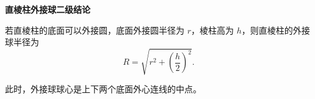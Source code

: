 \textbf{直棱柱外接球二级结论}

若直棱柱的底面可以外接圆，底面外接圆半径为 $r$，棱柱高为 $h$，则直棱柱的外接球半径为
\[
	R=\sqrt{r^2+\left(\frac h2\right)^2}.
\]

此时，外接球球心是上下两个底面外心连线的中点。